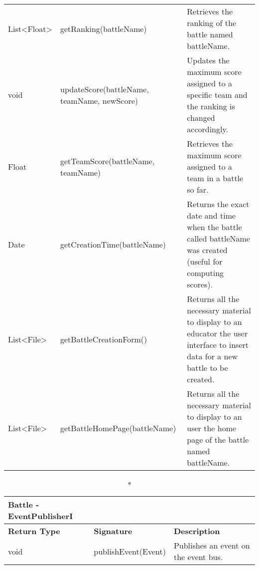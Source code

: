 \begin{longtable}{|p{2.5cm} p{6.5cm} p{4.5cm}|}
	List\textless Float\textgreater & getRanking(battleName) & Retrieves the ranking of the battle named battleName.\\
	
	void & updateScore(battleName, teamName, newScore) & Updates the maximum score assigned to a specific team and the ranking is changed accordingly.\\
	
	Float & getTeamScore(battleName, teamName) & Retrieves the maximum score assigned to a team in a battle so far.\\
	
	Date & getCreationTime(battleName) & Returns the exact date and time when the battle called battleName was created (useful for computing scores).\\
	
	List\textless File\textgreater & getBattleCreationForm() & Returns all the necessary material to display to an educator the user interface to insert data for a new battle to be created.\\
	
	List\textless File\textgreater & getBattleHomePage(battleName) & Returns all the necessary material to display to an user the home page of the battle named battleName.\\
	
	\hline
	
\end{longtable}




\begin{longtable}{|p{2.5cm} p{6.5cm} p{4.5cm}|}
\caption*{Battle - EventPublisherI}\\ 

\hline
\textbf{Return Type} & \textbf{Signature} & \textbf{Description}\\
\hline \endhead

void & publishEvent(Event)  & Publishes an event on the event bus.\\

\hline

\end{longtable}

\pagebreak


